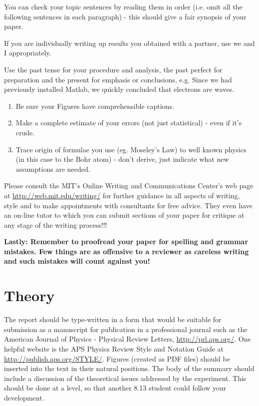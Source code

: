 You can check your topic sentences by reading them in order (i.e.
omit all the following sentences in each paragraph) - this should
give a fair synopsis of your paper.

If you are individually writing up results you obtained with a
partner, use we and I appropriately.

Use the past tense for your procedure and analysis, the past perfect
for preparation and the present for emphasis or conclusions, e.g.
Since we had previously installed Matlab, we quickly concluded that
electrons are waves.

\begin{enumerate}
\item Be sure your Figures have comprehensible captions.

\item Make a complete estimate of your errors (not just statistical) - even
if it's crude.

\item Trace origin of formulae you use (eg. Moseley's Law) to well known
physics (in this case to the Bohr atom) - don't derive, just
indicate what new assumptions are needed.
\end{enumerate}

Please consult the MIT's Online Writing and Communications
Center's web page at \url{http://web.mit.edu/writing/} for further
guidance in all aspects of writing, style and to make appointments
with consultants for free advice.  They even have an on-line tutor
to which you can submit sections of your paper for critique at any
stage of the writing process!!!

{\bf Lastly: Remember to proofread your paper for spelling and grammar
 mistakes.  Few things are as offensive to a reviewer as careless
 writing and such mistakes will count against you!}


\section{Theory}

The report should be type-written in a form that would be suitable
for submission as a manuscript for publication in a professional
journal such as the American Journal of Physics - Physical Review
Letters, \url{http://prl.aps.org/}.  One helpful website is the APS
Physics Review Style and Notation Guide at
\url{http://publish.aps.org/STYLE/}.  Figures (created as PDF files)
should be inserted into the text in their natural positions. The
body of the summary should include a discussion of the theoretical
issues addressed by the experiment.  This should be done at a level,
so that another 8.13 student could follow your development.

